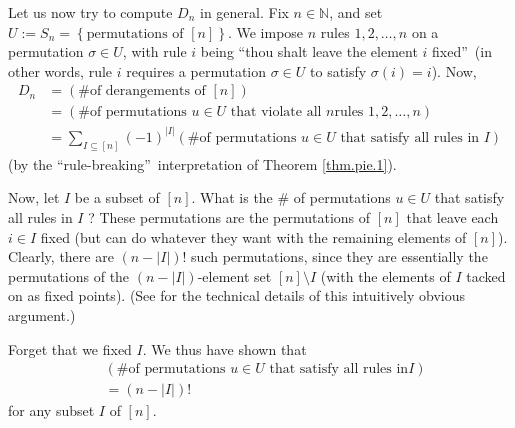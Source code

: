 \bigskip

Let us now try to compute $D_{n}$ in general. Fix $n\in\mathbb{N}$, and set
$U:=S_{n}=\left\{  \text{permutations of }\left[  n\right]  \right\}  $. We
impose $n$ rules $1,2,\ldots,n$ on a permutation $\sigma\in U$, with rule $i$
being \textquotedblleft thou shalt leave the element $i$
fixed\textquotedblright\ (in other words, rule $i$ requires a permutation
$\sigma\in U$ to satisfy $\sigma\left(  i\right)  =i$). Now,%
\begin{align*}
D_{n}  &  =\left(  \text{\# of derangements of }\left[  n\right]  \right) \\
&  =\left(  \text{\# of permutations }u\in U\text{ that violate all }n\text{
rules }1,2,\ldots,n\right) \\
&  =\sum_{I\subseteq\left[  n\right]  }\left(  -1\right)  ^{\left\vert
I\right\vert }\left(  \text{\# of permutations }u\in U\text{ that satisfy all
rules in }I\right)
\end{align*}
(by the \textquotedblleft rule-breaking\textquotedblright\ interpretation of
Theorem \ref{thm.pie.1}).

Now, let $I$ be a subset of $\left[  n\right]  $. What is the \# of
permutations $u\in U$ that satisfy all rules in $I$ ? These permutations are
the permutations of $\left[  n\right]  $ that leave each $i\in I$ fixed (but
can do whatever they want with the remaining elements of $\left[  n\right]
$). Clearly, there are $\left(  n-\left\vert I\right\vert \right)  !$ such
permutations, since they are essentially the permutations of the $\left(
n-\left\vert I\right\vert \right)  $-element set $\left[  n\right]  \setminus
I$ (with the elements of $I$ tacked on as fixed points). (See \cite[Corollary
2.9.16]{19fco} for the technical details of this intuitively obvious argument.)

Forget that we fixed $I$. We thus have shown that%
\begin{align}
&  \left(  \text{\# of permutations }u\in U\text{ that satisfy all rules in
}I\right) \nonumber\\
&  =\left(  n-\left\vert I\right\vert \right)  ! \label{eq.exa.pie1.2.3}%
\end{align}
for any subset $I$ of $\left[  n\right]  $.

